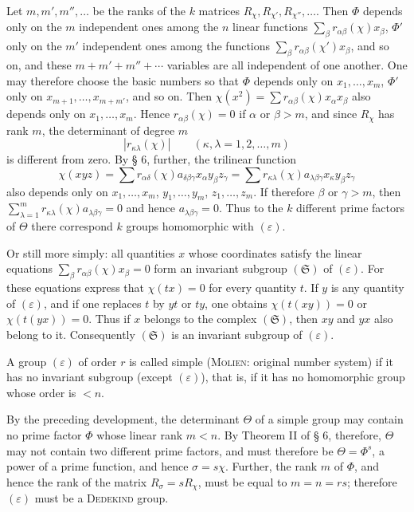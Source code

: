 \documentclass[11pt]{article}
\newcommand{\eps}{\varepsilon}
\begin{document}
Let $m,m',m'',\ldots$ be the ranks of the $k$ matrices $R_\chi,R_{\chi'},R_{\chi''},\ldots$. Then $\Phi$ depends only on the $m$ independent ones among the $n$ linear functions $\sum_\beta r_{\alpha\beta}(\chi)x_\beta$, $\Phi'$ only on the $m'$ independent ones among the functions $\sum_\beta r_{\alpha\beta}(\chi')x_\beta$, and so on, and these $m+m'+m''+\cdots$ variables are all independent of one another. One may therefore choose the basic numbers so that $\Phi$ depends only on $x_1,\ldots,x_m$, $\Phi'$ only on $x_{m+1},\ldots,x_{m+m'}$, and so on. Then $\chi(x^2)=\sum r_{\alpha\beta}(\chi)x_\alpha x_\beta$ also depends only on $x_1,\ldots,x_m$. Hence $r_{\alpha\beta}(\chi)=0$ if $\alpha$ or $\beta>m$, and since $R_\chi$ has rank $m$, the determinant of degree $m$
\[
 |r_{\kappa\lambda}(\chi)|\qquad(\kappa,\lambda=1,2,\ldots,m)
\]
is different from zero. By § 6, further, the trilinear function
\[
 \chi(xyz)=\sum r_{\alpha\delta}(\chi)a_{\delta\beta\gamma}x_\alpha y_\beta z_\gamma
 =\sum r_{\kappa\lambda}(\chi)a_{\lambda\beta\gamma}x_\kappa y_\beta z_\gamma
\]
also depends only on $x_1,\ldots,x_m$, $y_1,\ldots,y_m$, $z_1,\ldots,z_m$. If therefore $\beta$ or $\gamma>m$, then $\sum_{\lambda=1}^m r_{\kappa\lambda}(\chi)a_{\lambda\beta\gamma}=0$ and hence $a_{\lambda\beta\gamma}=0$. Thus to the $k$ different prime factors of $\Theta$ there correspond $k$ groups homomorphic with $(\eps)$.

Or still more simply: all quantities $x$ whose coordinates satisfy the linear equations $\sum_\beta r_{\alpha\beta}(\chi)x_\beta=0$ form an invariant subgroup $(\mathfrak S)$ of $(\eps)$. For these equations express that $\chi(tx)=0$ for every quantity $t$. If $y$ is any quantity of $(\eps)$, and if one replaces $t$ by $yt$ or $ty$, one obtains $\chi(t(xy))=0$ or $\chi(t(yx))=0$. Thus if $x$ belongs to the complex $(\mathfrak S)$, then $xy$ and $yx$ also belong to it. Consequently $(\mathfrak S)$ is an invariant subgroup of $(\eps)$.

A group $(\eps)$ of order $r$ is called simple (\textsc{Molien}: original number system) if it has no invariant subgroup (except $(\eps)$), that is, if it has no homomorphic group whose order is $<n$.

By the preceding development, the determinant $\Theta$ of a simple group may contain no prime factor $\Phi$ whose linear rank $m<n$. By Theorem II of § 6, therefore, $\Theta$ may not contain two different prime factors, and must therefore be $\Theta=\Phi^s$, a power of a prime function, and hence $\sigma=s\chi$. Further, the rank $m$ of $\Phi$, and hence the rank of the matrix $R_\sigma=sR_\chi$, must be equal to $m=n=rs$; therefore $(\eps)$ must be a \textsc{Dedekind} group.
\end{document}
